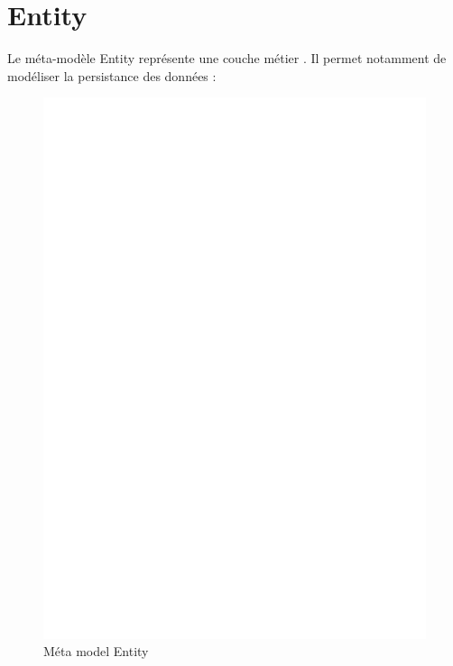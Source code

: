 \section{Entity}\label{sub:ent}
Le méta-modèle Entity représente une couche \og métier \fg{}. Il permet notamment de modéliser la persistance des données :  

\begin{figure}[htb]
  \centering
  \includegraphics[scale=.3]{img/Entity.eps}
  \caption{Méta model Entity}
  \label{fig:ent}
\end{figure}


\clearpage
